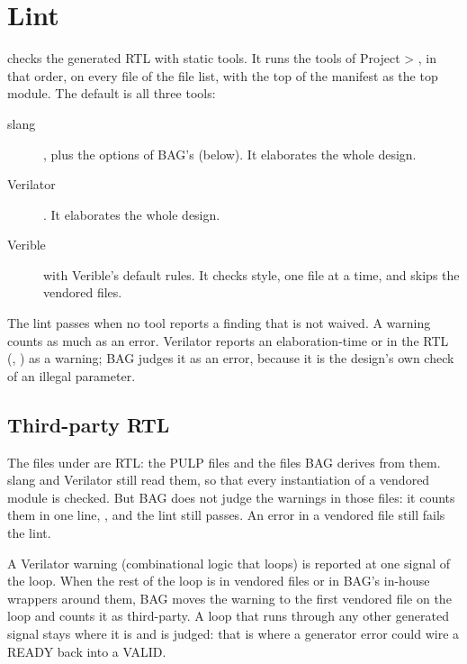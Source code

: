 \section{Lint}
\label{sec:lint}

 checks the generated RTL with static tools. It runs the tools of Project >
, in that order, on every file of the file list, with the top of the
manifest as the top module. The default is all three tools:

\begin{description}
\item[slang] , plus the options of BAG's
   (below). It elaborates the whole design.
\item[Verilator] . It elaborates the whole design.
\item[Verible]  with Verible's default rules. It checks style,
  one file at a time, and skips the vendored files.
\end{description}

The lint passes when no tool reports a finding that is not waived. A warning counts as
much as an error. Verilator reports an elaboration-time  or 
in the RTL (, ) as a warning; BAG judges it as an error,
because it is the design's own check of an illegal parameter.



\subsection{Third-party RTL}

The files under  are  RTL: the PULP files and the
files BAG derives from them. slang and Verilator still read them, so that every
instantiation of a vendored module is checked. But BAG does not judge the warnings in
those files: it counts them in one line, , and the lint still passes. An error in a vendored file still fails the lint.

A Verilator  warning (combinational logic that loops) is reported at one
signal of the loop. When the rest of the loop is in vendored files or in BAG's
in-house wrappers around them, BAG moves the warning to the first vendored file on the
loop and counts it as third-party. A loop that runs through any other generated signal
stays where it is and is judged: that is where a generator error could wire a READY
back into a VALID.

